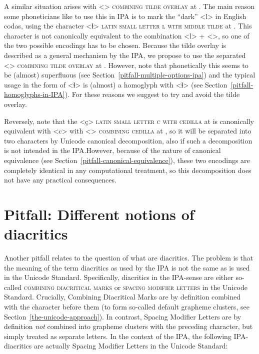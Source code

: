 A similar situation arises with <> \textsc{combining tilde overlay} at
. The main reason some phoneticians like to use this in IPA is to mark
the ``dark'' <l> in English codas, using the character <ɫ> \textsc{latin small
letter l with middle tilde} at . This character is not canonically
equivalent to the combination <l> + <>, so one of the two possible
encodings has to be chosen. Because the tilde overlay is described as a general
mechanism by the IPA, we propose to use the separated <>
\textsc{combining tilde overlay} at . However, note that phonetically 
this seems to be (almost) superfluous (see Section~\ref{pitfall-multiple-options-ipa}) 
and the typical usage in the form of <ɫ> is (almost) a homoglyph with <ɬ> (see 
Section~\ref{pitfall-homoglyphs-in-IPA}). For these reasons we suggest to try 
and avoid the tilde overlay.

Reversely, note that the <ç> \textsc{latin small letter c with cedilla} at
 is canonically equivalent with <c> with <>
\textsc{combining cedilla} at , so it will be separated into two
characters by Unicode canonical decomposition, also if such a decomposition is
not intended in the IPA.\@ However, because of the nature of canonical
equivalence (see Section~\ref{pitfall-canonical-equivalence}), these two
encodings are completely identical in any computational treatment, so this
decomposition does not have any practical consequences.

\section{Pitfall: Different notions of diacritics}
\label{pitfall-different-notions-of-diacritics}


Another pitfall relates to the question of what are diacritics. The problem is that
the meaning of the term diacritics as used by the IPA is not the same as is used
in the Unicode Standard. Specifically, diacritics in the IPA-sense are either
so-called \textsc{combining diacritical marks} or \textsc{spacing modifier
letters} in the Unicode Standard. Crucially, Combining Diacritical Marks are by
definition combined with the character before them (to form so-called default
grapheme clusters, see Section~\ref{the-unicode-approach}). In contrast, Spacing
Modifier Letters are by definition \emph{not} combined into grapheme clusters
with the preceding character, but simply treated as separate letters. In the
context of the IPA, the following IPA-diacritics are actually Spacing Modifier
Letters in the Unicode Standard:

